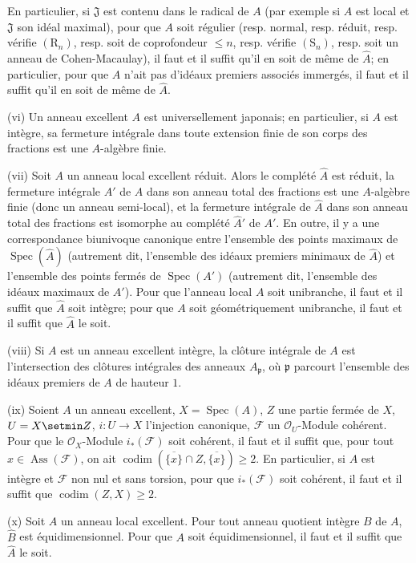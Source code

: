 \begin{scholium}[7.8.3]
En particulier, si $\mathfrak J$ est contenu dans le radical de $A$ \textup{(par
exemple si $A$ est local et $\mathfrak J$ son idéal maximal)}, pour que $A$ soit
régulier \textup{(resp.} normal, \textup{resp.} réduit, \textup{resp.} vérifie $(\mathrm R_n)$, \textup{resp.} soit
de coprofondeur $\leq n$, \textup{resp.} vérifie $(\mathrm S_n)$, \textup{resp.} soit un anneau
de Cohen-Macaulay), il faut et il suffit qu'il en soit de même de $\widehat A$;
en particulier, pour que $A$ n'ait pas d'idéaux premiers associés immergés, il
faut et il suffit qu'il en soit de même de $\widehat A$.

\textup{(vi)} Un anneau excellent $A$ est universellement japonais; en particulier, si
$A$ est intègre, sa fermeture intégrale dans toute extension finie de son corps
des fractions est une $A$-algèbre finie.

\textup{(vii)} Soit $A$ un anneau \textup{local} excellent réduit. Alors le complété $\widehat A$
est réduit, la fermeture intégrale $A'$ de $A$ dans son anneau total des
fractions est une $A$-algèbre finie \textup{(donc un anneau} semi-local), et la fermeture
intégrale de $\widehat A$ dans son anneau total des fractions est isomorphe au
complété $\widehat{A}'$ de $A'$. En outre, il y a une correspondance biunivoque
canonique entre l'ensemble des points maximaux de
$\operatorname{Spec}(\widehat A)$ \textup{(autrement dit, l'ensemble des idéaux premiers}
minimaux \textup{de $\widehat A$)} et l'ensemble des points fermés de
$\operatorname{Spec}(A')$ \textup{(autrement dit, l'ensemble des idéaux} maximaux \textup{de
$A'$)}. Pour que l'anneau local $A$ soit unibranche, il faut et il suffit que
$\widehat A$ soit intègre; pour que $A$ soit géométriquement unibranche, il faut
et il suffit que $\widehat A$ le soit.

\textup{(viii)} Si $A$ est un anneau excellent intègre, la clôture intégrale de $A$ est
l'intersection des clôtures intégrales des anneaux $A_{\mathfrak p}$, où
$\mathfrak p$ parcourt l'ensemble des idéaux premiers de $A$ de hauteur $1$.

\textup{(ix)} Soient $A$ un anneau excellent, $X=\operatorname{Spec}(A)$, $Z$ une partie
fermée de $X$, $U=X\setmin Z$, $i:U\to X$ l'injection canonique, $\mathcal F$ un
$\mathcal O_U$-Module cohérent. Pour que le $\mathcal O_X$-Module
$i_*(\mathcal F)$ soit cohérent, il faut et il suffit que, pour tout
$x\in\operatorname{Ass}(\mathcal F)$, on ait
$\operatorname{codim}(\overline{\{x\}}\cap Z,\overline{\{x\}})\geq2$. En
particulier, si $A$ est intègre et $\mathcal F$ non nul et sans torsion, pour que
$i_*(\mathcal F)$ soit cohérent, il faut et il suffit que
$\operatorname{codim}(Z,X)\geq2$.


\textup{(x)} Soit $A$ un anneau local excellent. Pour tout anneau quotient intègre $B$
de $A$, $\widehat B$ est équidimensionnel. Pour que $A$ soit équidimensionnel,
il faut et il suffit que $\widehat A$ le soit.
\end{scholium}

